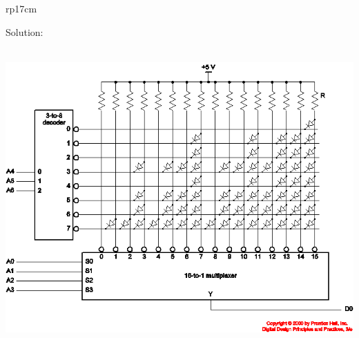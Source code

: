 \documentclass{article}
\begin{document}
\begin{longtable}[l]{rp{17cm}}
\begin{minipage}[t]{\linewidth}
Solution: \\ \\
\begin{center}
  \includegraphics[scale=0.4]{../Memory/Assessments/ROMStructure}
\end{center}
\end{minipage}\\
\medskip
\end{longtable}
\end{document}
